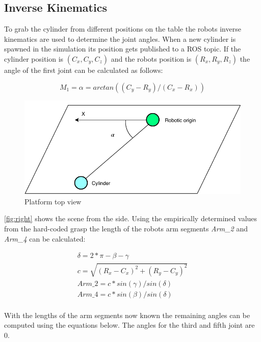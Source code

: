 \subsection{Inverse Kinematics}
To grab the cylinder from different positions on the table the robots inverse kinematics are used to determine the joint angles.
When a new cylinder is spawned in the simulation its position gets published to a ROS topic.
If the cylinder position is $(C_x, C_y, C_z)$ and the robots position is $(R_x, R_y, R_z)$ the angle of the first joint can be calculated as follows:

\begin{equation}
\label{simple_equation}
M_1=\alpha = arctan((C_y-R_y)/(C_x-R_x))
\end{equation}

\begin{figure}[htpb]
\centering
	\includegraphics[width=0.96\linewidth]{figures/top_view.pdf} 
	\caption{Platform top view}
	\vspace{-0.4cm}
	\label{fig:top}
\end{figure}


\autoref{fig:right} shows the scene from the side.
Using the empirically determined values from the hard-coded grasp the length of the robots arm segments \textit{Arm\_2} and \textit{Arm\_4} can be calculated:

\begin{equation}
\begin{aligned}
\delta=2*\pi-\beta-\gamma\\
c=\sqrt{(R_x-C_x)^2+(R_y-C_y)^2}\\
\textit{Arm\_2}=c*sin(\gamma)/sin(\delta)\\
\textit{Arm\_4}=c*sin(\beta)/sin(\delta)\\
\end{aligned}
\end{equation}

With the lengths of the arm segments now known the remaining angles can be computed using the equations below.
The angles for the third and fifth joint are 0.


